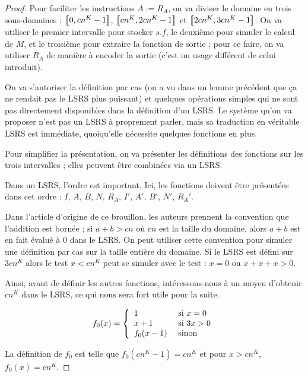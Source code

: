 \begin{appendices}
\begin{proof}
			
			Pour faciliter les instructions $A:=R_A$, on va diviser le domaine en trois sous-domaines : $\left[\,\!\!\!\left[ 0 , cn^K-1 \right]\,\!\!\!\right]$, $\left[\,\!\!\!\left[ cn^K , 2cn^K-1 \right]\,\!\!\!\right]$ et $\left[\,\!\!\!\left[ 2cn^K , 3cn^K-1 \right]\,\!\!\!\right]$.
			On va utiliser le premier intervalle pour stocker $s.f$, le deuxième pour simuler le calcul de $M$, et le troisième pour extraire la fonction de sortie ; pour ce faire, on va utiliser $R_A$ de manière à encoder la sortie (c'est un usage différent de celui introduit).
							
			On va s'autoriser la définition par cas (on a vu dans un lemme précédent que ça ne rendait pas le LSRS plus puissant) et quelques opérations simples qui ne sont pas directement disponibles dans la définition d'un LSRS. Le système qu'on va proposer n'est pas un LSRS à proprement parler, mais sa traduction en véritable LSRS est immédiate, quoiqu'elle nécessite quelques fonctions en plus.
			
			Pour simplifier la présentation, on va présenter les définitions des fonctions sur les trois intervalles ; elles peuvent être combinées via un LSRS. 
			
			Dans un LSRS, l'ordre est important. Ici, les fonctions doivent être présentées dans cet ordre : $I$, $A$, $B$, $N$, $R_A$, $I'$, $A'$, $B'$, $N'$, $R_A'$.
			
			Dans l'article d'origine \cite{GrandjeanSchwentick2002} de ce brouillon, les auteurs prennent la convention que l'addition est bornée ; si $a+b > cn$ où $cn$ est la taille du domaine, alors $a+b$ est en fait évalué à $0$ dans le LSRS. On peut utiliser cette convention pour simuler une définition par cas sur la taille entière du domaine. Si le LSRS est défini sur $3cn^K$ alors le test $x < cn^K$ peut se simuler avec le test : $x=0$ ou $x + x + x >0$.
			
			Ainsi, avant de définir les autres fonctions, intéressons-nous à un moyen d'obtenir $cn^K$ dans le LSRS, ce qui nous sera fort utile pour la suite.
			
			\begin{equation}
			f_0(x) = \left\lbrace \begin{array}{ll} 
				1 & \text{ si $x = 0$} \\
				x + 1 & \text{ si $3x >0$} \\
				f_0(x-1) & \text{ sinon}
			 \end{array} \right.
			\end{equation}
			
			
			La définition de $f_0$ est telle que $f_0(cn^K-1) = cn^K$ et pour $x>cn^K$, $f_0(x) = cn^K$. 
			

\end{proof}
\end{appendices}
